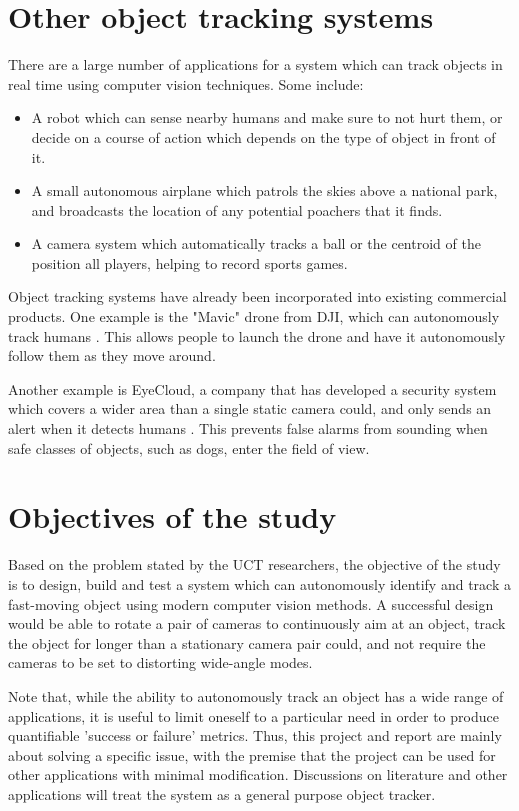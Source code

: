 \section{Other object tracking systems}
There are a large number of applications for a system which can track objects in real time using computer vision techniques. Some include:

\begin{itemize}
\item A robot which can sense nearby humans and make sure to not hurt them, or decide on a course of action which depends on the type of object in front of it.
\item A small autonomous airplane which patrols the skies above a national park, and broadcasts the location of any potential poachers that it finds.
\item A camera system which automatically tracks a ball or the centroid of the position all players, helping to record sports games.
\end{itemize}

Object tracking systems have already been incorporated into existing commercial products. One example is the "Mavic" drone from DJI, which can autonomously track humans \cite{website:DJI_mavic}. This allows people to launch the drone and have it autonomously follow them as they move around.

Another example is EyeCloud, a company that has developed a security system which covers a wider area than a single static camera could, and only sends an alert when it detects humans \cite{website:eyecloud}. This prevents false alarms from sounding when safe classes of objects, such as dogs, enter the field of view.



\section{Objectives of the study}
Based on the problem stated by the UCT researchers, the objective of the study is to design, build and test a system which can autonomously identify and track a fast-moving object using modern computer vision methods. A successful design would be able to rotate a pair of cameras to continuously aim at an object, track the object for longer than a stationary camera pair could, and not require the cameras to be set to distorting wide-angle modes.

Note that, while the ability to autonomously track an object has a wide range of applications, it is useful to limit oneself to a particular need in order to produce quantifiable 'success or failure' metrics. Thus, this project and report are mainly about solving a specific issue, with the premise that the project can be used for other applications with minimal modification. Discussions on literature and other applications will treat the system as a general purpose object tracker.



